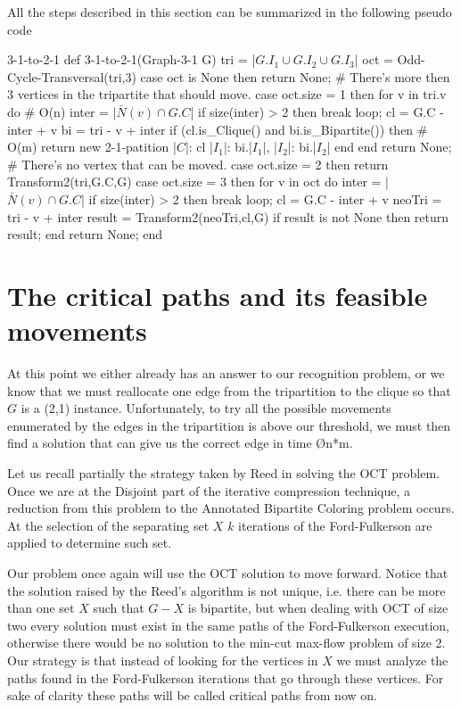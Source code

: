 All the steps described in this section can be summarized in the following pseudo code

\begin{code}{3-1-to-2-1}
def 3-1-to-2-1(Graph-3-1 G)
  tri = |$G.I_1 \cup G.I_2 \cup G.I_3$|
  oct = Odd-Cycle-Transversal(tri,3)
  case oct is None then
    return None; # There's more then 3 vertices in the tripartite that should move.
  case oct.size = 1 then
    for v in tri.v do # O(n)
      inter = |$\bar{N}(v) \cap G.C$|
      if size(inter) > 2 then
        break loop;
      cl = G.C - inter + v
      bi = tri - v + inter
      if (cl.is_Clique() and bi.is_Bipartite()) then # O(m)
        return new 2-1-patition{
          |$C$|: cl
          |$I_1$|: bi.|$I_1$|,
          |$I_2$|: bi.|$I_2$|
        }
      end
    end
    return None; # There's no vertex that can be moved.
  case oct.size = 2 then
    return Transform2(tri,G.C,G)
  case oct.size = 3 then
    for v in oct do
      inter = |$\bar{N}(v) \cap G.C$|
      if size(inter) > 2 then
        break loop;
      cl = G.C - inter + v
      neoTri = tri - v + inter
      result = Transform2(neoTri,cl,G)
      if result is not None then
        return result;
    end
    return None;
end
\end{code}

\section{The critical paths and its feasible movements}\label{sec:tcp}

At this point we either already has an answer to our recognition problem, or we know that we must reallocate one edge from the tripartition to the clique so that $G$ is a (2,1) instance.
Unfortunately, to try all the possible movements enumerated by the edges in the tripartition is above our threshold, we must then find a solution that can give us the correct edge in time \O{n*m}.

Let us recall partially the strategy taken by Reed in solving the OCT problem.
Once we are at the Disjoint part of the iterative compression technique, a reduction from this problem to the Annotated Bipartite Coloring problem occurs.
At the selection of the separating set $X$ $k$ iterations of the Ford-Fulkerson are applied to determine such set.

Our problem once again will use the OCT solution to move forward.
Notice that the solution raised by the Reed's algorithm is not unique, i.e. there can be more than one set $X$ such that $G-X$ is bipartite,
but when dealing with OCT of size two every solution must exist in the same paths of the Ford-Fulkerson execution, otherwise there would be no solution to the min-cut max-flow problem of size 2.
Our strategy is that instead of looking for the vertices in $X$ we must analyze the paths found in the Ford-Fulkerson iterations that go through these vertices.
For sake of clarity these paths will be called critical paths from now on.


